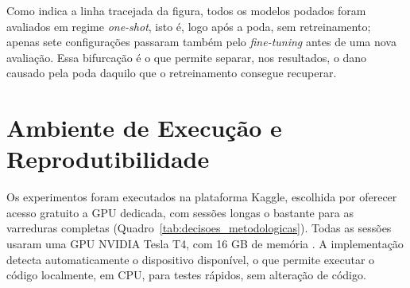 \begin{figure}[htb]
\end{figure}

Como indica a linha tracejada da figura, todos os modelos podados foram avaliados em regime
\textit{one-shot}, isto é, logo após a poda, sem retreinamento; apenas sete
configurações passaram também pelo
\textit{fine-tuning} antes de uma nova avaliação. Essa bifurcação é o que permite separar,
nos resultados, o dano causado pela poda daquilo que o retreinamento consegue recuperar.

\section{Ambiente de Execução e Reprodutibilidade}\label{sec:ambiente}

Os experimentos foram executados na plataforma Kaggle, escolhida por oferecer acesso
gratuito a GPU dedicada, com sessões longas o bastante para as varreduras completas
(Quadro~\ref{tab:decisoes_metodologicas}). Todas as sessões usaram uma GPU NVIDIA Tesla
T4, com 16 GB de memória \cite{NVIDIA2019T4}. A implementação detecta automaticamente o
dispositivo disponível, o que permite executar o código localmente, em CPU, para testes
rápidos, sem alteração de código.

